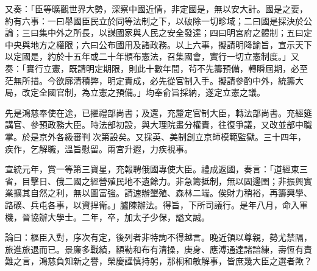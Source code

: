 \begin{pinyinscope}
又奏：「臣等曠觀世界大勢，深察中國近情，非定國是，無以安大計。國是之要，約有六事：一曰舉國臣民立於同等法制之下，以破除一切畛域；二曰國是採決於公論；三曰集中外之所長，以謀國家與人民之安全發達；四曰明宮府之體制；五曰定中央與地方之權限；六曰公布國用及諸政務。以上六事，擬請明降諭旨，宣示天下以定國是，約於十五年或二十年頒布憲法，召集國會，實行一切立憲制度。」又奏：「實行立憲，既請明定期限，則此十數年間，茍不先籌預備，轉瞬屆期，必至茫無所措。今欲廓清積弊，明定責成，必先從官制入手。擬請參酌中外，統籌大局，改定全國官制，為立憲之預備。」均奉俞旨採納，遂定立憲之議。

先是鴻慈奉使在途，已擢禮部尚書；及還，充釐定官制大臣，轉法部尚書。充經筵講官、參預政務大臣。時法部初設，與大理院畫分權責，往復爭議，又改並部中職掌。於是京外各級審判次第設矣。又採英、美制創立京師模範監獄。三十四年，疾作，乞解職，溫旨慰留。兩宮升遐，力疾視事。

宣統元年，賞一等第三寶星，充報聘俄國專使大臣。禮成返國，奏言：「道經東三省，目擊日、俄二國之經營殖民地不遺餘力。非急籌抵制，無以固邊圉；非振興實業擴其自然之利，無以圖富強。請速辦墾殖、森林二端。俟財力稍裕，再籌興學、路礦、兵屯各事，以資捍衛。」臚陳辦法。得旨，下所司議行。是年八月，命入軍機，晉協辦大學士。二年，卒，加太子少保，謚文誠。

論曰：樞臣入對，序次有定，後列者非特詢不得越言。晚近領以尊親，勢尤禁隔，旅進旅退而已。景廉多戰績，額勒和布有清操，庚身、應溥通達諸諳練，壽恆有責難之言，鴻慈負知新之譽，榮慶謹慎持躬，那桐和敏解事，皆庶幾大臣之選者歟？


\end{pinyinscope}
